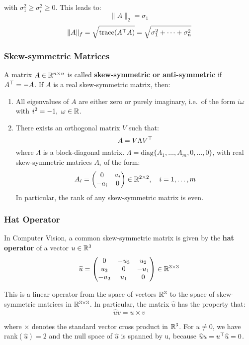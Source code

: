 with $\sigma^2_1 \ge \sigma^2_i \ge 0$. This leads to:
	\[\|A\|_2 = \sigma_1\]
	\[\|A\|_f = \sqrt{\text{trace}(A^{\top}A)} = \sqrt{\sigma^2_1 + \cdots + \sigma^2_n}\]

\subsubsection{Skew-symmetric Matrices}%
\label{ssub:skew_symmetric_matrices}

A matrix $A \in \mathbb{R}^{n \times n}$ is called
\textbf{skew-symmetric or anti-symmetric} if $A^{\top} = -A$.
If $A$ is a real skew-symmetric matrix, then:
\begin{enumerate}
	\item All eigenvalues of $A$ are either zero or purely imaginary,
		i.e.\ of the form $i\omega$ with $i ^2 = -1,\ \omega \in \mathbb{R}$.
	\item There exists an orthogonal matrix $V$ such that:
		\[A = V \Lambda V^{\top}\]
		where $\Lambda$ is a block-diagonal matrix.
		$\Lambda = \text{diag}\{A_1, \ldots, A_m, 0, \ldots, 0\}$,
		with real skew-symmetric matrices $A_i$ of the form:
		\[A_i = \begin{pmatrix}
				0 & a_i \\
				-a_i & 0
		\end{pmatrix}
		\in \mathbb{R}^{2 \times 2}, \quad i = 1, \ldots, m\]
		In particular, the rank of any skew-symmetric matrix is even.
\end{enumerate}


\subsubsection{Hat Operator}%
\label{ssub:hat_operator}

In Computer Vision, a common skew-symmetric matrix is given by the
\textbf{hat operator} of a vector $u \in \mathbb{R}^{3}$
	\[\widehat{u} = \begin{pmatrix}
		0 & -u_3 & u_2 \\
		u_3 & 0 & -u_1 \\
		-u_2 & u_1 & 0
	\end{pmatrix} \in \mathbb{R}^{3 \times 3}\]

This is a linear operator from the space of vectors $\mathbb{R}^3$
to the space of skew-symmetric matrices in $\mathbb{R}^{3 \times{} 3}$.
In particular, the matrix $\widehat{u}$ has the property that:
	\[\widehat{u}v = u \times v\]

where $\times$ denotes the standard vector cross product in $\mathbb{R}^3$.
For $u \ne 0$, we have $\text{rank}(\widehat{u}) = 2$ and the null space
of $\widehat{u}$ is spanned by u, because
$\widehat{u}u = u^{\top}\widehat{u} = 0$.


